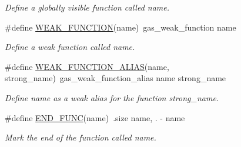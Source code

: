 \begin{DoxyCompactItemize}
\begin{DoxyCompactList}\small\item\em Define a globally visible function called {\itshape name}. \end{DoxyCompactList}\item 
\#define \hyperlink{group__assembler__group_ga81ab44c8186c742be6d8b16b9cb09b8b}{W\-E\-A\-K\-\_\-\-F\-U\-N\-C\-T\-I\-O\-N}(name)~gas\-\_\-weak\-\_\-function name
\begin{DoxyCompactList}\small\item\em Define a weak function called {\itshape name}. \end{DoxyCompactList}\item 
\#define \hyperlink{group__assembler__group_ga43ce83c479dda75a6edadaa377ed817d}{W\-E\-A\-K\-\_\-\-F\-U\-N\-C\-T\-I\-O\-N\-\_\-\-A\-L\-I\-A\-S}(name, strong\-\_\-name)~gas\-\_\-weak\-\_\-function\-\_\-alias name strong\-\_\-name
\begin{DoxyCompactList}\small\item\em Define {\itshape name} as a weak alias for the function {\itshape strong\-\_\-name}. \end{DoxyCompactList}\item 
\hypertarget{group__assembler__group_ga7a448fd290779d129685888f80cd76ff}{\#define \hyperlink{group__assembler__group_ga7a448fd290779d129685888f80cd76ff}{E\-N\-D\-\_\-\-F\-U\-N\-C}(name)~.size   name, . -\/ name}\label{group__assembler__group_ga7a448fd290779d129685888f80cd76ff}

\begin{DoxyCompactList}\small\item\em Mark the end of the function called {\itshape name}. \end{DoxyCompactList}\end{DoxyCompactItemize}
